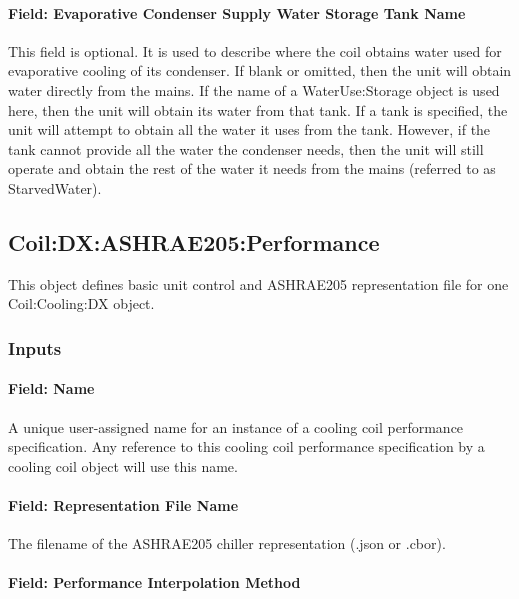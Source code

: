 \paragraph{Field: Evaporative Condenser Supply Water Storage Tank Name}\label{field-evaporative-condenser-supply-water-storage-tank-name-000}

This field is optional. It is used to describe where the coil obtains water used for evaporative cooling of its condenser. If blank or omitted, then the unit will obtain water directly from the mains. If the name of a WaterUse:Storage object is used here, then the unit will obtain its water from that tank. If a tank is specified, the unit will attempt to obtain all the water it uses from the tank. However, if the tank cannot provide all the water the condenser needs, then the unit will still operate and obtain the rest of the water it needs from the mains (referred to as StarvedWater).

\subsection{Coil:DX:ASHRAE205:Performance}\label{coildxashrae205performance}

This object defines basic unit control and ASHRAE205 representation file for one Coil:Cooling:DX object.

\subsubsection{Inputs}

\paragraph{Field: Name}

A unique user-assigned name for an instance of a cooling coil performance specification. Any reference to this cooling coil performance specification by a cooling coil object will use this name.

\paragraph{Field: Representation File Name}

The filename of the ASHRAE205 chiller representation (.json or .cbor).

\paragraph{Field: Performance Interpolation Method}

